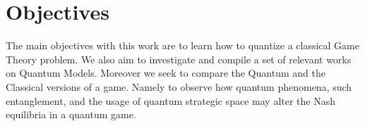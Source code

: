 \section{Objectives}
\label{sec:int_objectives}

The main objectives with this work are to learn how to quantize a classical Game Theory problem. We also aim to investigate and compile a set of relevant works on Quantum Models. Moreover we seek to compare the Quantum and the Classical versions of a game. Namely to observe how quantum phenomena, such entanglement, and the usage of quantum strategic space may alter the Nash equilibria in a quantum game.

